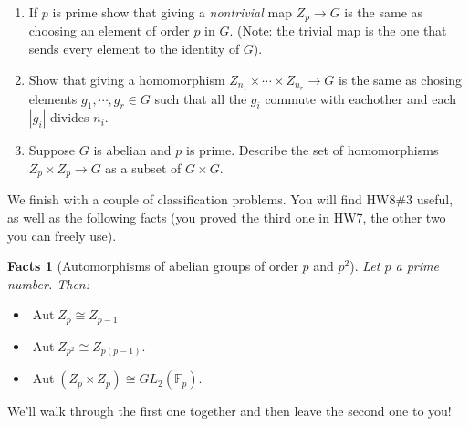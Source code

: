 \documentclass[11pt]{article}
\newtheorem*{facts}{Facts}
\newcommand{\Aut}{\operatorname{Aut}}
\newcommand{\bF}{\mathbb{F}}
\begin{document}
\begin{enumerate}
{\begin{enumerate}
{    Show that giving a homomorphism $Z_n\to G$ is the same as selecting an element $g\in G$ with $|g|$ dividing $n$.  That is, give a bijection between the following sets:
    \[\left\{
    \begin{array}{c}
      \text{Homomorphisms}\\
      Z_n\to G
    \end{array}\right\}
    \Longleftrightarrow
    \left\{
    \begin{array}{c}
      \text{Elements }g\in G\\
      \text{where }|g|\text{ divide }n
    \end{array}
    \right\}
    \]
    }
    \item{
    If $p$ is prime show that giving a \textit{nontrivial} map $Z_p\to G$ is the same as choosing an element of order $p$ in $G$. (Note: the trivial map is the one that sends every element to the identity of $G$).
    }
    \item{
    Show that giving a homomorphism $Z_{n_1}\times\cdots\times Z_{n_r}\to G$ is the same as chosing elements $g_1,\cdots,g_r\in G$ such that all the $g_i$ commute with eachother and each $|g_i|$ divides $n_i$.
    }
    \item{
    Suppose $G$ is abelian and $p$ is prime.  Describe the set of homomorphisms $Z_p\times Z_p\to G$ as a subset of $G\times G$.
    }
  \end{enumerate}
  }
\end{enumerate}
We finish with a couple of classification problems.  You will find HW8\#3 useful, as well as the following facts (you proved the third one in HW7, the other two you can freely use).
\begin{facts}[Automorphisms of abelian groups of order $p$ and $p^2$]
  Let $p$ a prime number.  Then:
  \begin{itemize}
    \item{
    $\Aut Z_p\cong Z_{p-1}$
    }
    \item{
    $\Aut Z_{p^2}\cong Z_{p(p-1)}.$
    }
    \item{
    $\Aut\left(Z_p\times Z_p\right)\cong GL_2(\bF_p).$
    }
  \end{itemize}
\end{facts}
We'll walk through the first one together and then leave the second one to you!
\end{document}
